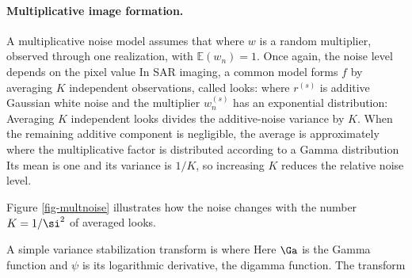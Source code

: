   
\paragraph{Multiplicative image formation.}

A multiplicative noise model assumes that
where $w$ is a random multiplier, observed through one realization, with $\mathbb E(w_n)=1$.
Once again, the noise level depends on the pixel value
In SAR imaging, a common model forms $f$ by averaging $K$ independent observations, called looks:
where $r^{(s)}$ is additive Gaussian white noise and the multiplier $w^{(s)}_n$ has an exponential distribution:
Averaging $K$ independent looks divides the additive-noise variance by $K$. When the remaining additive component is negligible, the average is approximately
where the multiplicative factor is distributed according to a Gamma distribution
Its mean is one and its variance is $1/K$, so increasing $K$ reduces the relative noise level.


Figure \ref{fig-multnoise} illustrates how the noise changes with the number $K=1/\si^2$ of averaged looks.

A simple variance stabilization transform is
where
Here $\Ga$ is the Gamma function and $\psi$ is its logarithmic derivative, the digamma function. The transform
